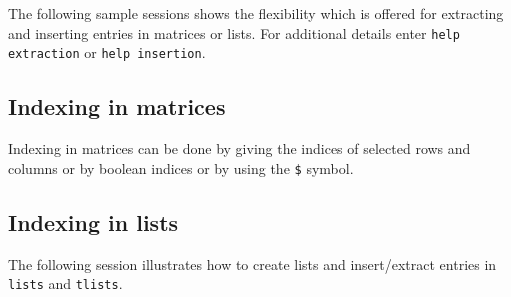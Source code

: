 The following sample sessions shows the flexibility which is offered
for extracting and inserting entries in matrices or lists.
For additional details enter \verb!help extraction! 
or \verb!help insertion!.
\subsection{Indexing in matrices}
Indexing in matrices can be done by giving the indices of selected
rows and columns or by boolean indices or by using the \verb!$! symbol.


\subsection{Indexing in lists}
The following session illustrates how to create lists and
insert/extract entries in {\tt lists} and {\tt tlists}.


